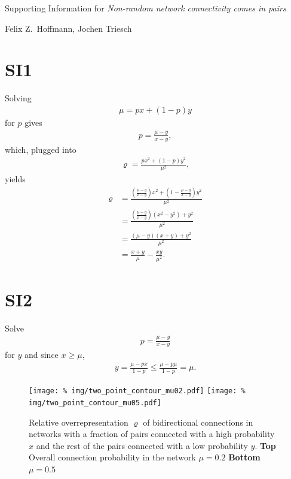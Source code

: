 \documentclass[11pt, paper=a4]{article}
\begin{document}
\begin{center}
  \Large
  Supporting Information for \textit{Non-random network connectivity comes in pairs}
  \smallskip
  \normalsize
  
  Felix Z.~Hoffmann, Jochen Triesch
\end{center}

\section*{SI1}

Solving
\begin{align}
\mu = px + (1-p)y
\end{align}
for $p$ gives
\begin{align}
  p = \frac{\mu-y}{x-y},
\end{align}
%
which, plugged into
\begin{align}
  \varrho = \frac{p x^2 + (1-p) y^2}{\mu^2},
\end{align}
yields
\begin{align}
  \varrho & = \frac{\left(\frac{\mu-y}{x-y}\right)x^2  + \left(1-\frac{\mu-y}{x-y}\right) y^2}{\mu^2} \\
  & = \frac{\left(\frac{\mu-y}{x-y}\right)(x^2-y^2) + y^2}{\mu^2}\\
  & = \frac{(\mu -y) (x+y) + y^2}{\mu^2} \\
  & = \frac{x+y}{\mu} - \frac{xy}{\mu^2}.
\end{align}

\section*{SI2}
Solve
\begin{align}
  p = \frac{\mu-y}{x-y}
\end{align}
for $y$ and since $x \geq \mu$,
\begin{align}
y = \frac{\mu - px}{1-p} \leq \frac{\mu - p\mu}{1-p} = \mu.
\end{align}


\begin{figure}[h!]
\centering
\texttt{[image: \%
  img/two\_point\_contour\_mu02.pdf]}
\texttt{[image: \%
  img/two\_point\_contour\_mu05.pdf]}
\caption{Relative overrepresentation $\varrho$ of bidirectional
  connections in networks with a fraction of pairs connected with a
  high probability $x$ and the rest of the pairs connected with a low
  probability $y$. \textbf{Top} Overall connection probability in the network $\mu = 0.2$ \textbf{Bottom} $\mu =0.5$ }
\label{fig:tp}
\end{figure}
\end{document}
